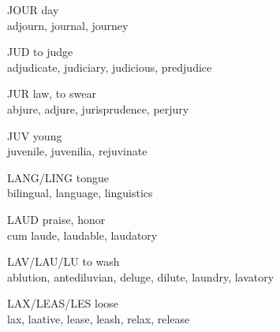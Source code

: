 \begin{flashcard}[Roots]{JOUR}
day\\
\vspace{0.2in}
adjourn, journal, journey\\
\end{flashcard}

\begin{flashcard}[Roots]{JUD}
to judge\\
\vspace{0.2in}
adjudicate, judiciary, judicious, predjudice\\
\end{flashcard}

\begin{flashcard}[Roots]{JUR}
law, to swear\\
\vspace{0.2in}
abjure, adjure, jurisprudence, perjury\\
\end{flashcard}

\begin{flashcard}[Roots]{JUV}
young\\
\vspace{0.2in}
juvenile, juvenilia, rejuvinate\\
\end{flashcard}

\begin{flashcard}[Roots]{LANG/LING}
tongue\\
\vspace{0.2in}
bilingual, language, linguistics\\
\end{flashcard}

\begin{flashcard}[Roots]{LAUD}
praise, honor\\
\vspace{0.2in}
cum laude, laudable, laudatory\\
\end{flashcard}

\begin{flashcard}[Roots]{LAV/LAU/LU}
to wash\\
\vspace{0.2in}
ablution, antediluvian, deluge, dilute, laundry, lavatory\\
\end{flashcard}

\begin{flashcard}[Roots]{LAX/LEAS/LES}
loose\\
\vspace{0.2in}
lax, laative, lease, leash, relax, release\\
\end{flashcard}

